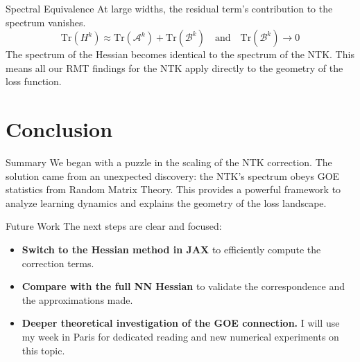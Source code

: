 \documentclass{beamer}
\begin{document}
\begin{frame}{Spectral Equivalence}
At large widths, the residual term's contribution to the spectrum vanishes.
\begin{equation}
\mathrm{Tr}(H^k) \approx \mathrm{Tr}(\mathcal{A}^k) + \mathrm{Tr}(\mathcal{B}^k) \quad \text{and} \quad \mathrm{Tr}(\mathcal{B}^k) \to 0
\end{equation}
\vfill
The spectrum of the Hessian becomes identical to the spectrum of the NTK.
\vfill
This means all our RMT findings for the NTK apply directly to the geometry of the loss function.
\end{frame}

\section{Conclusion}

\begin{frame}{Summary}
We began with a puzzle in the scaling of the NTK correction.
\vfill
The solution came from an unexpected discovery: the NTK's spectrum obeys GOE statistics from Random Matrix Theory.
\vfill
This provides a powerful framework to analyze learning dynamics and explains the geometry of the loss landscape.
\end{frame}

\begin{frame}{Future Work}
The next steps are clear and focused:
\begin{itemize}
    \item \textbf{Switch to the Hessian method in JAX} to efficiently compute the correction terms.
    \item \textbf{Compare with the full NN Hessian} to validate the correspondence and the approximations made.
    \item \textbf{Deeper theoretical investigation of the GOE connection.} I will use my week in Paris for dedicated reading and new numerical experiments on this topic.
\end{itemize}
\end{frame}
\end{document}
